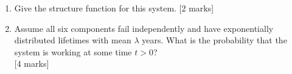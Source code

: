 \documentclass[12pt]{article}
\begin{document}
\begin{enumerate}
\begin{enumerate}
\item Give the structure function for this system.
			\hfill [2 marks] 
%
\item Assume all six components fail independently and have exponentially distributed lifetimes with mean $\lambda$ years. What is the probability that the system is working at some time $t>0$? 
			\\\phantom{1}\hfill [4 marks] 
%
\end{enumerate}

\end{enumerate}
\end{document}
